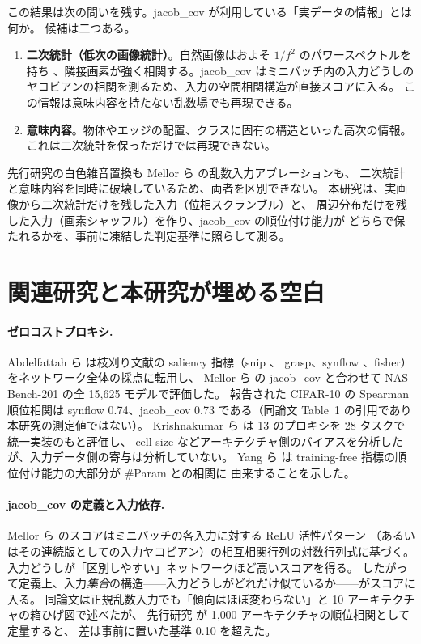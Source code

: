 \documentclass[11pt]{article}
\providecommand{\unverified}[1]{#1}
\begin{document}
この結果は次の問いを残す。jacob\_cov が利用している「実データの情報」とは何か。
候補は二つある。

\begin{enumerate}
\item \textbf{二次統計（低次の画像統計）}。自然画像はおよそ $1/f^2$ のパワースペクトルを持ち
\cite{vanderschaaf1996power}、隣接画素が強く相関する。jacob\_cov はミニバッチ内の入力どうしの
ヤコビアンの相関を測るため、入力の空間相関構造が直接スコアに入る。
この情報は意味内容を持たない乱数場でも再現できる。
\item \textbf{意味内容}。物体やエッジの配置、クラスに固有の構造といった高次の情報。
これは二次統計を保っただけでは再現できない。
\end{enumerate}

先行研究の白色雑音置換も Mellor ら \cite{mellor2021naswot} の乱数入力アブレーションも、
二次統計と意味内容を同時に破壊しているため、両者を区別できない。
本研究は、実画像から二次統計だけを残した入力（位相スクランブル）と、
周辺分布だけを残した入力（画素シャッフル）を作り、jacob\_cov の順位付け能力が
どちらで保たれるかを、事前に凍結した判定基準に照らして測る。

\section{関連研究と本研究が埋める空白}

\paragraph{ゼロコストプロキシ.}
Abdelfattah ら \cite{abdelfattah2021zerocost} は枝刈り文献の saliency 指標（snip \cite{lee2019snip}、
grasp、synflow \cite{tanaka2020synflow}、fisher）をネットワーク全体の採点に転用し、
Mellor ら \cite{mellor2021naswot} の jacob\_cov と合わせて NAS-Bench-201 の全 15{,}625 モデルで評価した。
報告された CIFAR-10 の Spearman 順位相関は synflow \unverified{0.74}、jacob\_cov \unverified{0.73}
である（同論文 Table~1 の引用であり本研究の測定値ではない）。
Krishnakumar ら \cite{krishnakumar2022nbsz} は 13 のプロキシを 28 タスクで統一実装のもと評価し、
cell size などアーキテクチャ側のバイアスを分析したが、入力データ側の寄与は分析していない。
Yang ら \cite{yang2023revisiting} は training-free 指標の順位付け能力の大部分が \#Param との相関に
由来することを示した。

\paragraph{jacob\_cov の定義と入力依存.}
Mellor ら \cite{mellor2021naswot} のスコアはミニバッチの各入力に対する ReLU 活性パターン
（あるいはその連続版としての入力ヤコビアン）の相互相関行列の対数行列式に基づく。
入力どうしが「区別しやすい」ネットワークほど高いスコアを得る。
したがって定義上、入力\emph{集合}の構造——入力どうしがどれだけ似ているか——がスコアに入る。
同論文は正規乱数入力でも「傾向はほぼ変わらない」と 10 アーキテクチャの箱ひげ図で述べたが、
先行研究 \cite{airas20260903zcproxy} が 1{,}000 アーキテクチャの順位相関として定量すると、
差は事前に置いた基準 0.10 を超えた。
\end{document}
